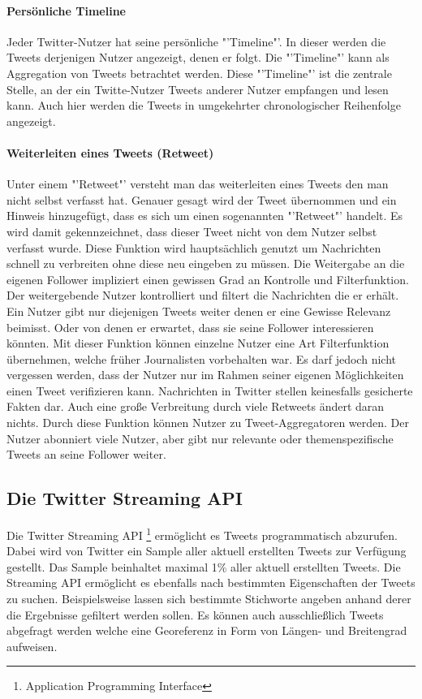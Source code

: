 			\paragraph{Persönliche Timeline}
				Jeder Twitter-Nutzer hat seine persönliche "'Timeline"'.
				In dieser werden die Tweets derjenigen Nutzer angezeigt, denen er folgt. 
				Die "'Timeline"' kann als Aggregation von Tweets betrachtet werden.
				Diese "'Timeline"' ist die zentrale Stelle, an der ein Twitte-Nutzer Tweets anderer Nutzer empfangen und lesen kann.
				Auch hier werden die Tweets in umgekehrter chronologischer Reihenfolge angezeigt.  

			\paragraph{Weiterleiten eines Tweets (Retweet)}
				Unter einem "'Retweet"' versteht man das weiterleiten eines Tweets den man nicht selbst verfasst hat.
				Genauer gesagt wird der Tweet übernommen und ein Hinweis hinzugefügt, dass es sich um einen sogenannten "'Retweet"' handelt.
				Es wird damit gekennzeichnet, dass dieser Tweet nicht von dem Nutzer selbst verfasst wurde.
				Diese Funktion wird hauptsächlich genutzt um Nachrichten schnell zu verbreiten ohne diese neu eingeben zu müssen. 
				Die Weitergabe an die eigenen Follower impliziert einen gewissen Grad an Kontrolle und Filterfunktion. 
				Der weitergebende Nutzer kontrolliert und filtert die Nachrichten die er erhält.
				Ein Nutzer gibt nur diejenigen Tweets weiter denen er eine Gewisse Relevanz beimisst.
				Oder von denen er erwartet, dass sie seine Follower interessieren könnten. 
				Mit dieser Funktion können einzelne Nutzer eine Art Filterfunktion übernehmen, welche früher Journalisten vorbehalten war. 
				Es darf jedoch nicht vergessen werden, dass der Nutzer nur im Rahmen seiner eigenen Möglichkeiten einen Tweet verifizieren kann.
				Nachrichten in Twitter stellen keinesfalls gesicherte Fakten dar.
				Auch eine große Verbreitung durch viele Retweets ändert daran nichts.
				Durch diese Funktion können Nutzer zu Tweet-Aggregatoren werden.
				Der Nutzer abonniert viele Nutzer, aber gibt nur relevante oder themenspezifische Tweets an seine Follower weiter.

		\subsection{Die Twitter Streaming API}

			Die Twitter Streaming API \footnote{Application Programming Interface} ermöglicht es Tweets programmatisch abzurufen.
			Dabei wird von Twitter ein Sample aller aktuell erstellten Tweets zur Verfügung gestellt.  
			Das Sample beinhaltet maximal 1\% aller aktuell erstellten Tweets.
			Die Streaming API ermöglicht es ebenfalls nach bestimmten Eigenschaften der Tweets zu suchen.
			Beispielsweise lassen sich bestimmte Stichworte angeben anhand derer die Ergebnisse gefiltert werden sollen.
			Es können auch ausschließlich Tweets abgefragt werden welche eine Georeferenz in Form von Längen- und Breitengrad aufweisen. 

